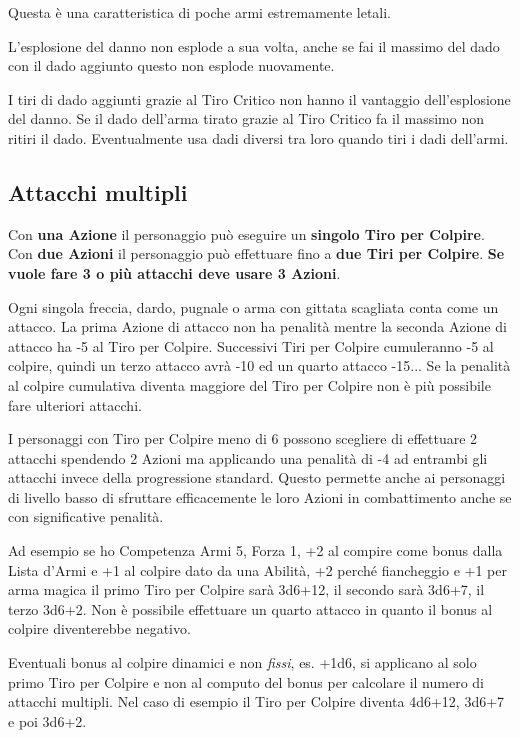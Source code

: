 \begin{multicols}{2}
Questa è una caratteristica di poche armi estremamente letali.

L'esplosione del danno non esplode a sua volta, anche se fai il massimo del dado con il dado aggiunto questo non esplode nuovamente.

I tiri di dado aggiunti grazie al Tiro Critico non hanno il vantaggio dell'esplosione del danno. Se il dado dell'arma tirato grazie al Tiro Critico fa il massimo non ritiri il dado. Eventualmente usa dadi diversi tra loro quando tiri i dadi dell'armi.


\subsection{Attacchi multipli}\label{attacchimultiplimischia}\hypertarget{attacchimultiplimischia}{}
Con \textbf{una Azione} il personaggio può eseguire un \textbf{singolo Tiro per Colpire}.
Con \textbf{due Azioni} il personaggio può effettuare fino a \textbf{due Tiri per Colpire}. \textbf{Se vuole fare 3 o più attacchi deve usare 3 Azioni}.

Ogni singola freccia, dardo, pugnale o arma con gittata scagliata conta come un attacco.
La prima Azione di attacco non ha penalità mentre la seconda Azione di attacco ha -5 al Tiro per Colpire. Successivi Tiri per Colpire cumuleranno -5 al colpire, quindi un terzo attacco avrà -10 ed un quarto attacco -15...
Se la penalità al colpire cumulativa diventa maggiore del Tiro per Colpire non è più possibile fare ulteriori attacchi.

I personaggi con Tiro per Colpire meno di 6 possono scegliere di effettuare 2 attacchi spendendo 2 Azioni ma applicando una penalità di -4 ad entrambi gli attacchi invece della progressione standard. Questo permette anche ai personaggi di livello basso di sfruttare efficacemente le loro Azioni in combattimento anche se con significative penalità.

\begin{giocatore}
Ad esempio se ho Competenza Armi 5, Forza 1, +2 al compire come bonus dalla Lista d'Armi e +1 al colpire dato da una Abilità, +2 perché fiancheggio e +1 per arma magica il primo Tiro per Colpire sarà 3d6+12, il secondo sarà 3d6+7, il terzo 3d6+2. Non è possibile effettuare un quarto attacco in quanto il bonus al colpire diventerebbe negativo.
\end{giocatore}

Eventuali bonus al colpire dinamici e non \emph{fissi}, es. +1d6, si applicano al solo primo Tiro per Colpire e non al computo del bonus per calcolare il numero di attacchi multipli. Nel caso di esempio il Tiro per Colpire diventa 4d6+12, 3d6+7 e poi 3d6+2.


\end{multicols}
